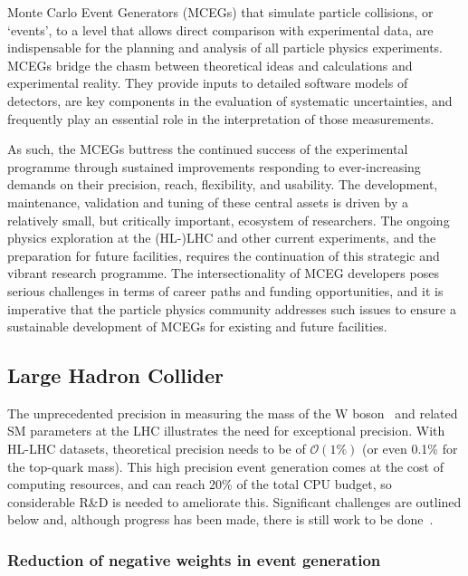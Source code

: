 \documentclass[10pt,a4paper]{article}
\begin{document}
Monte Carlo Event Generators (MCEGs) that simulate particle collisions,
or `events', to a level that allows direct comparison with
experimental data, are indispensable for the planning and analysis of
all particle physics experiments. MCEGs bridge
the chasm between theoretical ideas and calculations
and experimental reality. They provide inputs to
detailed software models of detectors, are key components in the
evaluation of systematic uncertainties, and frequently
play an essential role in the interpretation of those measurements.

As such, the MCEGs buttress the continued success of the experimental programme
through sustained improvements responding to ever-increasing demands on their
precision, reach, flexibility, and usability. The development, maintenance,
validation and tuning of these central assets is driven by a relatively small,
but critically important, ecosystem of researchers. The ongoing physics
exploration at the (HL-)LHC and other current experiments, and the preparation
for future facilities, requires the continuation of this strategic and vibrant
research programme. The intersectionality of MCEG developers poses serious
challenges in terms of career paths and funding opportunities, and it is
imperative that the particle physics community addresses such issues to ensure a
sustainable development of MCEGs for existing and future facilities.

\subsection{Large Hadron Collider}\label{large-hadron-collider}

The unprecedented precision in measuring the mass of the $\mathrm{W}$
boson~\cite{CMS:2024lrd} and related SM parameters at the LHC illustrates the
need for exceptional precision. With HL-LHC datasets, theoretical precision
needs to be of $\mathcal{O}(1\%)$ (or even 0.1\% for the top-quark mass). This
high precision event generation comes at the cost of computing resources, and
can reach 20\% of the total CPU budget, so considerable R\&D is needed to
ameliorate this. Significant challenges are outlined below and, although
progress has been made, there is still work to be
done~\cite{HSFPhysicsEventGeneratorWG:2020gxw,maltoni2022tf07snowmassreporttheory,10.21468/SciPostPhys.16.5.130}.

\subsubsection{Reduction of negative weights in event
generation}\label{reduction-of-negative-weights-in-event-generation}
\end{document}
